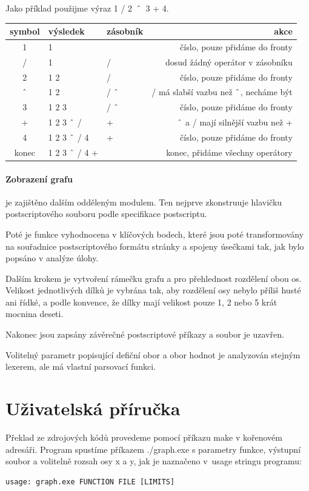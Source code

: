 \documentclass[11pt]{article}
\newcommand\CARET{\mathbin{\char`\^}}
\begin{document}
Jako příklad použijme výraz 1 / 2~$\CARET$~3 + 4.
\begin{center}
\begin{tabular}{|c|l|l|r|}
\hline
symbol & výsledek & zásobník & akce \\
\hline
1 & 1 & & číslo, pouze přidáme do fronty \\
/ & 1 & / & dosud žádný operátor v zásobníku\\
2 & 1 2 & / & číslo, pouze přidáme do fronty \\
$\CARET$ & 1 2 & / $\CARET$ & / má slabší vazbu než $\CARET$, necháme být \\
3 & 1 2 3 & / $\CARET$ & číslo, pouze přidáme do fronty \\
+ & 1 2 3 $\CARET$ / & + & $\CARET$ a / mají silnější vazbu než + \\
4 & 1 2 3 $\CARET$ / 4 & + & číslo, pouze přidáme do fronty \\
konec  & 1 2 3 $\CARET$ / 4 + & & konec, přidáme všechny operátory \\

\hline
\end{tabular}
\end{center}

\paragraph{Zobrazení grafu}
je zajištěno dalším odděleným modulem. Ten nejprve zkonstruuje hlavičku
postscriptového souboru podle specifikace postscriptu. 

Poté je funkce vyhodnocena v klíčových bodech, které jsou poté transformovány
na souřadnice postscriptového formátu stránky a spojeny úsečkami tak, jak bylo
popsáno v analýze úlohy. 

Dalším krokem je vytvoření rámečku grafu a pro přehlednost rozdělení obou os.
Velikost jednotlivých dílků je vybrána tak, aby rozdělení osy nebylo příliš
husté ani řídké, a podle konvence, že dílky mají velikost pouze 1, 2 nebo 5
krát mocnina deseti.

Nakonec jsou zapsány závěrečné postscriptové příkazy a soubor je uzavřen.

Volitelný parametr popisující defiční obor a obor hodnot je analyzován stejným
lexerem, ale má vlastní parsovací funkci.

\section{Uživatelská příručka}
Překlad ze zdrojových kódů provedeme pomocí příkazu make v kořenovém adresáři.
Program spustíme příkazem ./graph.exe s parametry funkce, výstupní
soubor a volitelně rozsah osy x a y, jak je naznačeno v~usage stringu programu:
\begin{verbatim}
usage: graph.exe FUNCTION FILE [LIMITS]
\end{verbatim}
\end{document}
